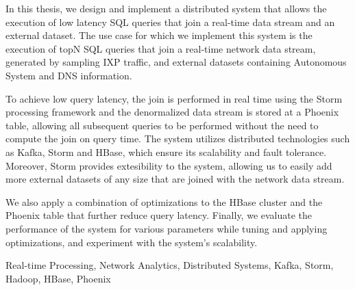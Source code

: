 \begin{abstracten}

In this thesis, we design and implement a distributed system that allows the execution of low latency SQL queries that join a real-time data stream and an external dataset. The use case for which we implement this system is the execution of topN SQL queries that join a real-time network data stream, generated by sampling IXP traffic, and external datasets containing Autonomous System and DNS information. 

To achieve low query latency, the join is performed in real time using the Storm processing framework and the denormalized data stream is stored at a Phoenix table, allowing all subsequent queries to be performed without the need to compute the join on query time. The system utilizes distributed technologies such as Kafka, Storm and HBase, which ensure its scalability and fault tolerance. Moreover, Storm provides extesibility to the system, allowing us to easily add more external datasets of any size that are joined with the network data stream.

We also apply a combination of optimizations to the HBase cluster and the Phoenix table that further reduce query latency. Finally, we evaluate the performance of the system for various parameters while tuning and applying optimizations, and experiment with the system's scalability.

\begin{keywordsen}
Real-time Processing, Network Analytics, Distributed Systems, Kafka, Storm, Hadoop, HBase, Phoenix
\end{keywordsen}
\end{abstracten}
